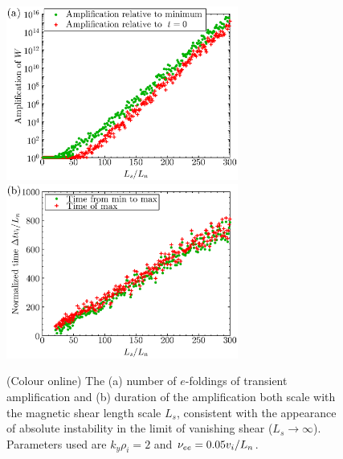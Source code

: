 \documentclass{jpp}
\begin{document}
\begin{figure}
\centerline{
\includegraphics[width=3in]{fig4a.eps}
\includegraphics[width=3in]{fig4b.eps}
}
\caption{(Colour online) The (a) number of $e$-foldings of transient amplification and (b)
duration of the amplification both scale with the magnetic shear length scale $L_s$,
consistent with the appearance of absolute instability in the limit of vanishing shear ($L_s \to \infty$).
Parameters used are $k_y \rho_i = 2$ and $\nu_{ee} = 0.05 v_i / L_n$.
\label{fig:transientAmplificationVsLsOverLn}}
\end{figure}
\end{document}
